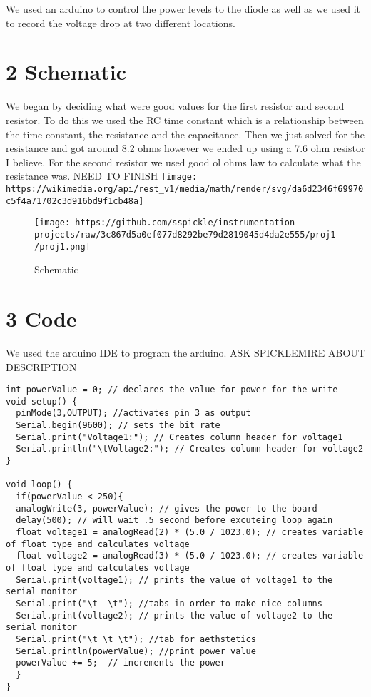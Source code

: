 \documentclass[11pt]{article}
\makeatletter
\def\maxwidth{\ifdim\Gin@nat@width>\linewidth\linewidth
    \else\Gin@nat@width\fi}
\let\Oldincludegraphics\includegraphics
\renewcommand{\includegraphics}[1]{\Oldincludegraphics[width=.8\maxwidth]{#1}}
\makeatother
\begin{document}
We used an arduino to control the power levels to the diode as well as
we used it to record the voltage drop at two different locations.

\section{2 Schematic}\label{schematic}

We began by deciding what were good values for the first resistor and
second resistor. To do this we used the RC time constant which is a
relationship between the time constant, the resistance and the
capacitance. Then we just solved for the resistance and got around 8.2
ohms however we ended up using a 7.6 ohm resistor I believe. For the
second resistor we used good ol ohms law to calculate what the
resistance was. NEED TO FINISH
\texttt{[image: https://wikimedia.org/api/rest\_v1/media/math/render/svg/da6d2346f69970c5f4a71702c3d916bd9f1cb48a]}

\begin{figure}
\centering
\texttt{[image: https://github.com/sspickle/instrumentation-projects/raw/3c867d5a0ef077d8292be79d2819045d4da2e555/proj1/proj1.png]}
\caption{Schematic}
\end{figure}

\section{3 Code}\label{code}

We used the arduino IDE to program the arduino. ASK SPICKLEMIRE ABOUT
DESCRIPTION

\begin{verbatim}
int powerValue = 0; // declares the value for power for the write
void setup() { 
  pinMode(3,OUTPUT); //activates pin 3 as output
  Serial.begin(9600); // sets the bit rate
  Serial.print("Voltage1:"); // Creates column header for voltage1 
  Serial.println("\tVoltage2:"); // Creates column header for voltage2
}

void loop() { 
  if(powerValue < 250){
  analogWrite(3, powerValue); // gives the power to the board
  delay(500); // will wait .5 second before excuteing loop again
  float voltage1 = analogRead(2) * (5.0 / 1023.0); // creates variable of float type and calculates voltage
  float voltage2 = analogRead(3) * (5.0 / 1023.0); // creates variable of float type and calculates voltage
  Serial.print(voltage1); // prints the value of voltage1 to the serial monitor
  Serial.print("\t  \t"); //tabs in order to make nice columns
  Serial.print(voltage2); // prints the value of voltage2 to the serial monitor
  Serial.print("\t \t \t"); //tab for aethstetics
  Serial.println(powerValue); //print power value
  powerValue += 5;  // increments the power
  }
}
\end{verbatim}
\end{document}
